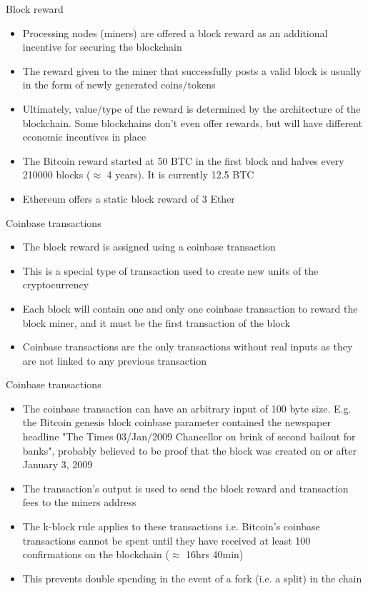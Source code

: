 \documentclass[10pt]{beamer}
\begin{document}
\begin{frame}{Block reward}
	\begin{itemize}
		\item Processing nodes (miners) are offered a block reward as an additional incentive for securing the blockchain
		\item The reward given to the miner that successfully posts a valid block is usually in the form of newly generated coins/tokens
		\item Ultimately, value/type of the reward is determined by the architecture of the blockchain. Some blockchains don't even offer rewards, but will have different economic incentives in place
		\item The Bitcoin reward started at 50 BTC in the first block and halves every 210000 blocks ($\approx$ 4 years). It is currently 12.5 BTC
		\item Ethereum offers a static block reward of 3 Ether
	\end{itemize}
\end{frame}



\begin{frame}{Coinbase transactions}
	\begin{itemize}
		\item The block reward is assigned using a coinbase transaction
		\item This is a special type of transaction used to create new units of the cryptocurrency
		\item Each block will contain one and only one coinbase transaction to reward the block miner, and it must be the first transaction of the block
		\item Coinbase transactions are the only transactions without real inputs as they are not linked to any previous transaction
	\end{itemize}
\end{frame}


\begin{frame}{Coinbase transactions}
	\begin{itemize}
		\item The coinbase transaction can have an arbitrary input of 100 byte size. E.g. the Bitcoin genesis block coinbase parameter contained the newspaper  headline "The Times 03/Jan/2009 Chancellor on brink of second bailout for banks", probably believed to be proof that the block was created on or after January 3, 2009
		\item The transaction's output is used to send the block reward and transaction fees to the miners address
		\item The k-block rule applies to these transactions i.e. Bitcoin's coinbase transactions cannot be spent until they have received at least 100 confirmations on the blockchain ($\approx$ 16hrs 40min)
		\item This prevents double spending in the event of a fork (i.e. a split) in the chain
	\end{itemize}
\end{frame}
\end{document}
